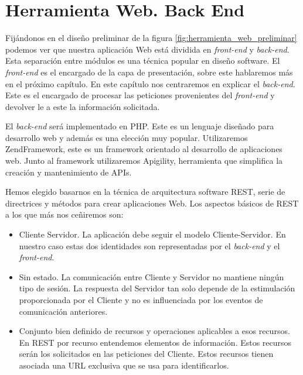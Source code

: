 \chapter{Herramienta Web. Back End}
\label{backend}

Fijándonos en el diseño preliminar de la figura \ref{fig:herramienta_web_preliminar} podemos ver que nuestra aplicación Web está dividida en
\emph{front-end} y \emph{back-end}. Esta separación entre módulos es una técnica popular en diseño software. El \emph{front-end} es el encargado de
la capa de presentación, sobre este hablaremos más en el próximo capítulo. En este capítulo nos centraremos en explicar el \emph{back-end}. Este es el
encargado de procesar las peticiones provenientes del \emph{front-end} y devolver le a este la información solicitada. 
\par
El \emph{back-end} será implementado en PHP\cite{PHP}. Este es un lenguaje diseñado para desarrollo web y además es una elección muy popular. 
Utilizaremos ZendFramework\cite{ZF}, este es un framework orientado al desarrollo de aplicaciones web. Junto al framework utilizaremos 
Apigility\cite{Apigility}, herramienta que simplifica la creación y mantenimiento de APIs.
\par
Hemos elegido basarnos en la técnica de arquitectura software REST\cite{Rest}, serie de directrices y métodos para crear aplicaciones Web. Los
aspectos básicos de REST a los que más nos ceñiremos son:
\begin{itemize}
	\item	Cliente Servidor. La aplicación debe seguir el modelo Cliente-Servidor. En nuestro caso estas dos identidades son representadas por el
	  	\emph{back-end} y el \emph{front-end}.
	\item	Sin estado. La comunicación entre Cliente y Servidor no mantiene ningún tipo de sesión. La respuesta del Servidor tan solo depende de
	  	la estimulación proporcionada por el Cliente y no es influenciada por los eventos de comunicación anteriores.
	\item	Conjunto bien definido de recursos y operaciones aplicables a esos recursos. En REST por recurso entendemos elementos de información.
	  	Estos recursos serán los solicitados en las peticiones del Cliente. Estos recursos tienen asociada una URL exclusiva que se usa para
		identificarlos.
\end{itemize}
